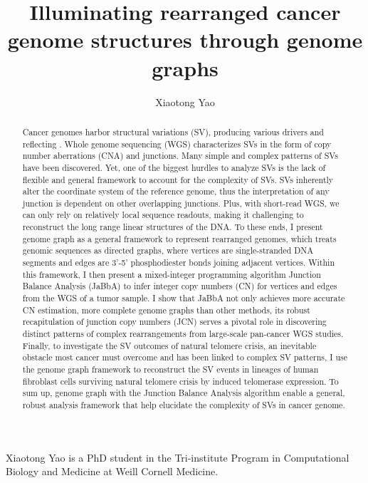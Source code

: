 \documentclass[phd,tocprelim]{cornell}
\title{Illuminating rearranged cancer genome structures through genome graphs}
\author {Xiaotong Yao}
\begin{document}
\maketitle
\makecopyright

\begin{abstract}
Cancer genomes harbor structural variations (SV), producing various drivers and reflecting . Whole genome sequencing (WGS) characterizes SVs in the form of copy number aberrations (CNA) and junctions. Many simple and complex patterns of SVs have been discovered. Yet, one of the biggest hurdles to analyze SVs is the lack of flexible and general framework to account for the complexity of SVs. SVs inherently alter the coordinate system of the reference genome, thus the interpretation of any junction is dependent on other overlapping junctions. Plus, with short-read WGS, we can only rely on relatively local sequence readouts, making it challenging to reconstruct the long range linear structures of the DNA. To these ends, I present genome graph as a general framework to represent rearranged genomes, which treats genomic sequences as directed graphs, where vertices are single-stranded DNA segments and edges are 3'-5' phosphodiester bonds joining adjacent vertices. Within this framework, I then present a mixed-integer programming algorithm Junction Balance Analysis (JaBbA) to infer integer copy numbers (CN) for vertices and edges from the WGS of a tumor sample. I show that JaBbA not only achieves more accurate CN estimation, more complete genome graphs than other methods, its robust recapitulation of junction copy numbers (JCN) serves a pivotal role in discovering distinct patterns of complex rearrangements from large-scale pan-cancer WGS studies. Finally, to investigate the SV outcomes of natural telomere crisis, an inevitable obstacle most cancer must overcome and has been linked to complex SV patterns, I use the genome graph framework to reconstruct the SV events in lineages of human fibroblast cells surviving natural telomere crisis by induced telomerase expression. To sum up, genome graph with the Junction Balance Analysis algorithm enable a general, robust analysis framework that help elucidate the complexity of SVs in cancer genome.
\end{abstract}

\begin{biosketch}
Xiaotong Yao is a PhD student in the Tri-institute Program in Computational Biology and Medicine at Weill Cornell Medicine.
\end{biosketch}
\end{document}

